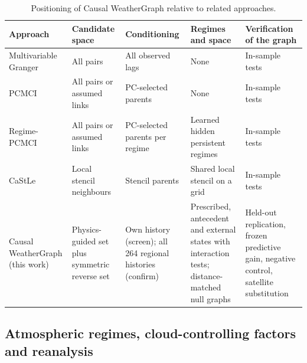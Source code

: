 \documentclass[preprint,12pt]{elsarticle}
\begin{document}
\begin{table}[htbp]
\centering
\caption{Positioning of Causal WeatherGraph relative to related approaches.}
\label{tab:positioning}
\footnotesize
\setlength{\tabcolsep}{3pt}
\begin{tabular}{@{}p{}p{}p{}p{}p{}@{}}
\toprule
Approach & Candidate space & Conditioning & Regimes and space & Verification of the graph \\
\midrule
Multivariable Granger \citep{Shojaie2022Granger} & All pairs & All observed lags & None & In-sample tests \\
PCMCI \citep{Runge2019PCMCI} & All pairs or assumed links & PC-selected parents & None & In-sample tests \\
Regime-PCMCI \citep{Saggioro2020RegimePCMCI} & All pairs or assumed links & PC-selected parents per regime & Learned hidden persistent regimes & In-sample tests \\
CaStLe \citep{Nichol2025CaStLe} & Local stencil neighbours & Stencil parents & Shared local stencil on a grid & In-sample tests \\
Causal WeatherGraph (this work) & Physics-guided set plus symmetric reverse set & Own history (screen); all 264 regional histories (confirm) & Prescribed, antecedent and external states with interaction tests; distance-matched null graphs & Held-out replication, frozen predictive gain, negative control, satellite substitution \\
\bottomrule
\end{tabular}
\end{table}

\subsection{Atmospheric regimes, cloud-controlling factors and reanalysis}
\end{document}
